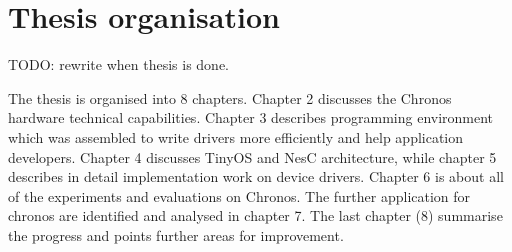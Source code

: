 \section{Thesis organisation}
TODO: rewrite when thesis is done.

The thesis is organised into 8 chapters. Chapter 2 discusses the Chronos hardware technical capabilities. Chapter 3 describes programming environment which was assembled to write drivers more efficiently and help application developers. Chapter 4 discusses TinyOS and NesC architecture, while chapter 5 describes in detail implementation work on device drivers. Chapter 6 is about all of the experiments and evaluations on Chronos. The further application for chronos are identified and analysed in chapter 7. The last chapter (8) summarise the progress and points further areas for improvement.
